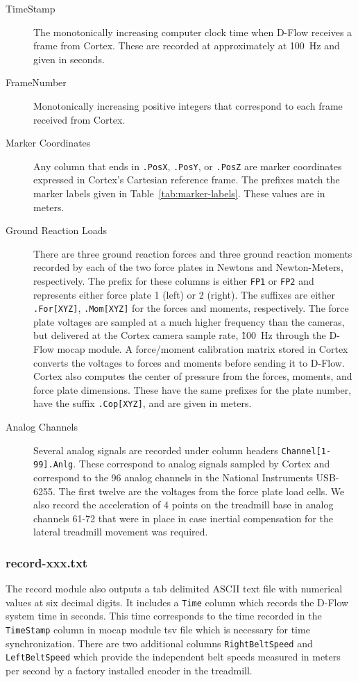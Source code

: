 \documentclass[fleqn,12pt]{wlpeerj}
\begin{document}
\begin{description}
  \item[TimeStamp] The monotonically increasing computer clock time when D-Flow
    receives a frame from Cortex. These are recorded at approximately at
    100~\si{\hertz} and given in seconds.
  \item[FrameNumber] Monotonically increasing positive integers that correspond
    to each frame received from Cortex.
  \item[Marker Coordinates] Any column that ends in \verb+.PosX+, \verb+.PosY+,
    or \verb+.PosZ+ are marker coordinates expressed in Cortex's Cartesian
    reference frame. The prefixes match the marker labels given in
    Table~\ref{tab:marker-labels}. These values are in meters.
  \item[Ground Reaction Loads] There are three ground reaction forces and three
    ground reaction moments recorded by each of the two force plates in Newtons
    and Newton-Meters, respectively. The prefix for these columns is either
    \verb+FP1+ or \verb+FP2+ and represents either force plate 1 (left) or 2
    (right). The suffixes are either \verb+.For[XYZ]+, \verb+.Mom[XYZ]+ for the
    forces and moments, respectively. The force plate voltages are sampled at a
    much higher frequency than the cameras, but delivered at the Cortex camera
    sample rate, \~100~\si{\hertz} through the D-Flow mocap module. A
    force/moment calibration matrix stored in Cortex converts the voltages to
    forces and moments before sending it to D-Flow. Cortex also computes
    the center of pressure from the forces, moments, and force plate
    dimensions. These have the same prefixes for the plate number, have the
    suffix \verb+.Cop[XYZ]+, and are given in meters.
  \item[Analog Channels] Several analog signals are recorded under column
    headers \verb+Channel[1-99].Anlg+. These correspond to analog signals
    sampled by Cortex and correspond to the 96 analog channels in the National
    Instruments USB-6255. The first twelve are the voltages from the
    force plate load cells. We also record the acceleration of 4 points on the
    treadmill base in analog channels 61-72 that were in place in case inertial
    compensation for the lateral treadmill movement was required.
\end{description}

\subsubsection*{record-xxx.txt}
%
The record module also outputs a tab delimited ASCII text file with numerical
values at six decimal digits. It includes a \verb+Time+ column which records
the D-Flow system time in seconds. This time corresponds to the time recorded
in the \verb+TimeStamp+ column in mocap module tsv file which is necessary for
time synchronization. There are two additional columns \verb+RightBeltSpeed+
and \verb+LeftBeltSpeed+ which provide the independent belt speeds measured in
meters per second by a factory installed encoder in the treadmill.
\end{document}
